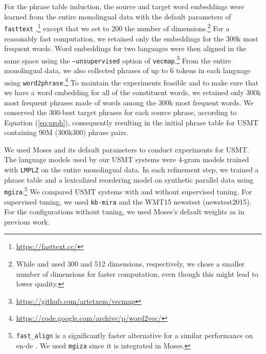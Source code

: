\documentclass[11pt,a4paper]{article}
\newcommand{\Eq}[1]{{Equation (\ref{eq:#1})}}
\newcommand{\moses}{Moses}
\begin{document}
For the phrase table induction, the source and target word embeddings were learned from the entire monolingual data with the default parameters of \texttt{fasttext} \citep{bojanowski2017enriching},\footnote{\url{https://fasttext.cc/}} except that we set to 200 the number of dimensions.\footnote{While \citet{artetxe2018unsupervised} and \citet{DBLP:journals/corr/abs-1804-07755} used 300 and 512 dimensions, respectively, we chose a smaller number of dimensions for faster computation, even though this might lead to lower quality.} For a reasonably fast computation, we retained only the embeddings for the 300k most frequent words. Word embeddings for two languages were then aligned in the same space using the \texttt{--unsupervised} option of \texttt{vecmap}.\footnote{\url{https://github.com/artetxem/vecmap}}  From the entire monolingual data, we also collected phrases of up to 6 tokens in each language using \texttt{word2phrase}.\footnote{\url{https://code.google.com/archive/p/word2vec/}} To maintain the experiments feasible and to make sure that we have a word embedding for all of the constituent words, we retained only 300k most frequent phrases made of words among the 300k most frequent words. We conserved the 300-best target phrases for each source phrase, according to \Eq{prob}, consequently resulting in the initial phrase table for USMT containing 90M (300k300) phrase pairs.

We used {\moses} and its default parameters to conduct experiments for USMT. The language models used by our USMT systems were 4-gram models trained with \texttt{LMPLZ} \citep{P13-2121} on the entire monolingual data.  In each refinement step, we trained a phrase table and a lexicalized reordering model on synthetic parallel data using \texttt{mgiza}.\footnote{\texttt{fast\_align} \citep{dyer-chahuneau-smith:2013:NAACL-HLT} is a significantly faster alternative for a similar performance on en-de \citep{W14-3309}. We used \texttt{mgiza} since it is integrated in {\moses}.} We compared USMT systems with and without supervised tuning. For supervised tuning, we used \texttt{kb-mira} \citep{N12-1047} and the WMT15 newstest (newstest2015). For the configurations without tuning, we used {\moses}'s default weights as in previous work.
\end{document}
